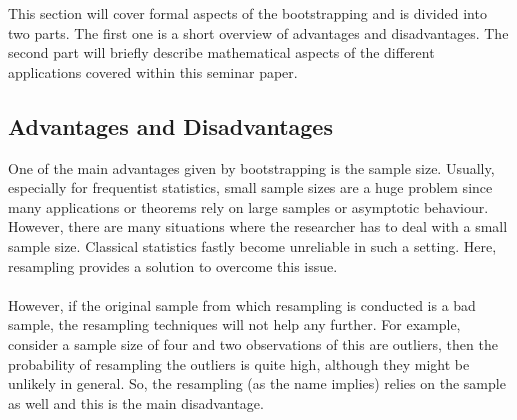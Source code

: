 This section will cover formal aspects of the bootstrapping and is divided into two parts. The first one is a short overview of advantages and disadvantages. The second part will briefly describe mathematical aspects of the different applications covered within this seminar paper. 

\subsection{Advantages and Disadvantages}
One of the main advantages given by bootstrapping is the sample size. Usually, especially for frequentist statistics, small sample sizes are a huge problem since many applications or theorems rely on large samples or asymptotic behaviour. However, there are many situations where the researcher has to deal with a small sample size. Classical statistics fastly become unreliable in such a setting. Here, resampling provides a solution to overcome this issue. \\
\\
\noindent However, if the original sample from which resampling is conducted is a bad sample, the resampling techniques will not help any further. For example, consider a sample size of four and two observations of this are outliers, then the probability of resampling the outliers is quite high, although they might be unlikely in general. So, the resampling (as the name implies) relies on the sample as well and this is the main disadvantage. 

